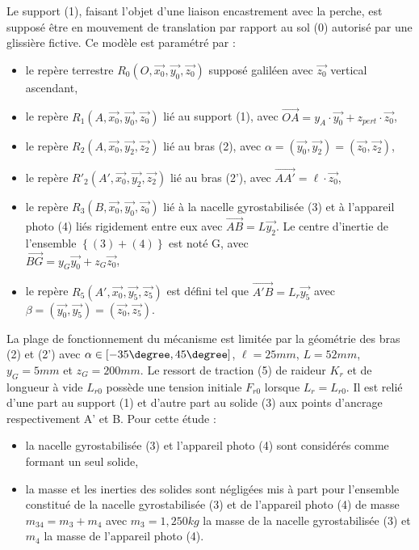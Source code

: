 Le support (1), faisant l'objet d'une liaison encastrement avec la perche, est supposé être en mouvement de translation par rapport au sol (0) autorisé par une glissière fictive. Ce modèle est paramétré par :
\begin{itemize}
 \item le repère terrestre $R_0(O,\overrightarrow{x_0},\overrightarrow{y_0},\overrightarrow{z_0})$ supposé galiléen avec $\overrightarrow{z_0}$ vertical ascendant,
 \item le repère $R_1(A,\overrightarrow{x_0},\overrightarrow{y_0},\overrightarrow{z_0})$ lié au support (1), avec $\overrightarrow{OA}=y_A\cdot\overrightarrow{y_0}+z_{pert}\cdot\overrightarrow{z_0}$,
 \item le repère $R_2(A,\overrightarrow{x_0},\overrightarrow{y_2},\overrightarrow{z_2})$ lié au bras (2), avec $\alpha=(\overrightarrow{y_0},\overrightarrow{y_2})=(\overrightarrow{z_0},\overrightarrow{z_2})$, 
 \item le repère $R'_2(A',\overrightarrow{x_0},\overrightarrow{y_2},\overrightarrow{z_2})$ lié au bras (2'), avec $\overrightarrow{AA'}=\ell\cdot\overrightarrow{z_0}$,
 \item le repère $R_3(B,\overrightarrow{x_0},\overrightarrow{y_0},\overrightarrow{z_0})$ 	lié à la nacelle gyrostabilisée (3) et à l'appareil photo (4) liés rigidement entre eux
avec $\overrightarrow{AB}=L\overrightarrow{y_2}$. Le centre d'inertie de l'ensemble $\left\{(3) + (4)\right\}$ est noté G, avec \\ $\overrightarrow{BG}=y_G\overrightarrow{y_0}+z_G\overrightarrow{z_0}$,
\item le repère $R_5(A',\overrightarrow{x_0},\overrightarrow{y_5},\overrightarrow{z_5})$ est défini tel que $\overrightarrow{A'B}=L_r\overrightarrow{y_5}$ avec $\beta=(\overrightarrow{y_0},\overrightarrow{y_5})=(\overrightarrow{z_0},\overrightarrow{z_5})$.
\end{itemize}

La plage de fonctionnement du mécanisme est limitée par la géométrie des bras (2) et (2') avec $\alpha\in[-35\degree,45\degree]$, $\ell=25mm$, $L=52mm$, $y_G=5mm$ et $z_G=200mm$.
Le ressort de traction (5) de raideur $K_r$ et de longueur à vide $L_{r0}$ possède une tension initiale $F_{r0}$ lorsque $L_r=L_{r0}$. Il est relié d'une part au support (1) et d'autre part au solide (3) aux points d'ancrage respectivement A' et B.
Pour cette étude :
\begin{itemize}
 \item la nacelle gyrostabilisée (3) et l'appareil photo (4) sont considérés comme formant un seul solide,
 \item la masse et les inerties des solides sont négligées mis à part pour l'ensemble constitué de la nacelle gyrostabilisée (3) et de l'appareil photo (4) de masse $m_{34}=m_3+m_4$ avec $m_3=1,250kg$ la masse de la nacelle gyrostabilisée (3) et $m_4$ la masse de l'appareil photo (4).
\end{itemize}

